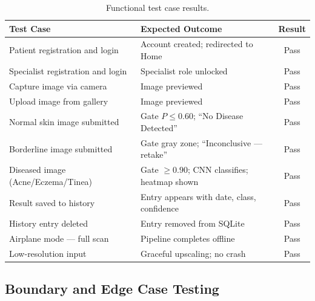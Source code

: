 \begin{table}[H]
\centering
\caption{Functional test case results.}
\label{tab:functional_tests}
\begin{tabular}{|p{5.5cm}|p{4cm}|c|}
\hline
\textbf{Test Case} & \textbf{Expected Outcome} & \textbf{Result} \\ \hline
Patient registration and login & Account created; redirected to Home & Pass \\ \hline
Specialist registration and login & Specialist role unlocked & Pass \\ \hline
Capture image via camera & Image previewed & Pass \\ \hline
Upload image from gallery & Image previewed & Pass \\ \hline
Normal skin image submitted & Gate $P\le0.60$; ``No Disease Detected'' & Pass \\ \hline
Borderline image submitted & Gate gray zone; ``Inconclusive — retake'' & Pass \\ \hline
Diseased image (Acne/Eczema/Tinea) & Gate $\ge0.90$; CNN classifies; heatmap shown & Pass \\ \hline
Result saved to history & Entry appears with date, class, confidence & Pass \\ \hline
History entry deleted & Entry removed from SQLite & Pass \\ \hline
Airplane mode — full scan & Pipeline completes offline & Pass \\ \hline
Low-resolution input & Graceful upscaling; no crash & Pass \\ \hline
\end{tabular}
\end{table}

\subsection{Boundary and Edge Case Testing}

